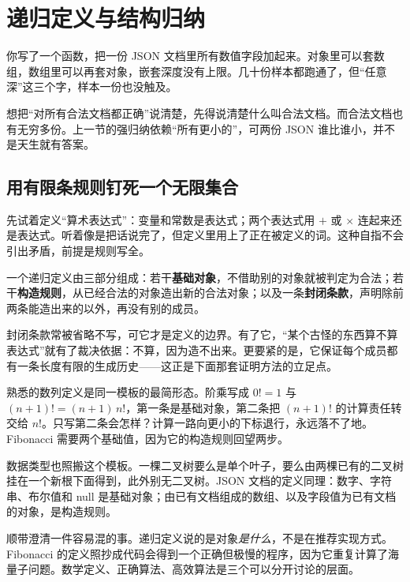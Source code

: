 \section{递归定义与结构归纳}
\label{sec:01-Mathematical-Language/04-Induction-and-Recursion/03}

你写了一个函数，把一份 JSON 文档里所有数值字段加起来。对象里可以套数组，数组里可以再套对象，嵌套深度没有上限。几十份样本都跑通了，但``任意深''这三个字，样本一份也没触及。

想把``对所有合法文档都正确''说清楚，先得说清楚什么叫合法文档。而合法文档也有无穷多份。上一节的强归纳依赖``所有更小的''，可两份 JSON 谁比谁小，并不是天生就有答案。

\subsection{用有限条规则钉死一个无限集合}

先试着定义``算术表达式''：变量和常数是表达式；两个表达式用 \(+\) 或 \(\times\) 连起来还是表达式。听着像是把话说完了，但定义里用上了正在被定义的词。这种自指不会引出矛盾，前提是规则写全。

\begin{definition}
一个递归定义由三部分组成：若干\textbf{基础对象}，不借助别的对象就被判定为合法；若干\textbf{构造规则}，从已经合法的对象造出新的合法对象；以及一条\textbf{封闭条款}，声明除前两条能造出来的以外，再没有别的成员。
\end{definition}

封闭条款常被省略不写，可它才是定义的边界。有了它，``某个古怪的东西算不算表达式''就有了裁决依据：不算，因为造不出来。更要紧的是，它保证每个成员都有一条长度有限的生成历史——这正是下面那套证明方法的立足点。

熟悉的数列定义是同一模板的最简形态。阶乘写成 \(0!=1\) 与 \((n+1)!=(n+1)\,n!\)，第一条是基础对象，第二条把 \((n+1)!\) 的计算责任转交给 \(n!\)。只写第二条会怎样？计算一路向更小的下标退行，永远落不了地。Fibonacci 需要两个基础值，因为它的构造规则回望两步。

数据类型也照搬这个模板。一棵二叉树要么是单个叶子，要么由两棵已有的二叉树挂在一个新根下面得到，此外别无二叉树。JSON 文档的定义同理：数字、字符串、布尔值和 null 是基础对象；由已有文档组成的数组、以及字段值为已有文档的对象，是构造规则。

顺带澄清一件容易混的事。递归定义说的是对象\emph{是什么}，不是在推荐实现方式。Fibonacci 的定义照抄成代码会得到一个正确但极慢的程序，因为它重复计算了海量子问题。数学定义、正确算法、高效算法是三个可以分开讨论的层面。

